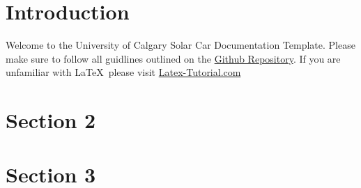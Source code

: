 \begin{titlepage}
    
    \vfill %
  
  \end{titlepage}
  
  
  \tableofcontents
  \listoffigures
  \listoftables
  
  
  \section{Introduction}
  Welcome to the University of Calgary Solar Car Documentation Template.
  Please make sure to follow all guidlines outlined on the \href{https://github.com/UCSolarCarTeam/Documentation-Electrical}{Github Repository}.
  If you are unfamiliar with \LaTeX\ please visit \href{https://www.latex-tutorial.com/tutorials/}{Latex-Tutorial.com}
  
  \section{Section 2}
  
  \section{Section 3}
  
  
  
  
  \begin{versionhistory}
  \end{versionhistory}


